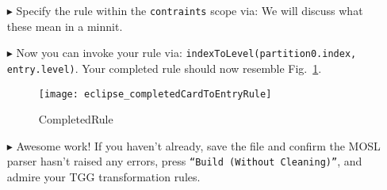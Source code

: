\begin{itemize}
\item[$\blacktriangleright$] Specify the rule within the \texttt{contraints} scope via:  We will discuss what
these mean in a minnit.

\item[$\blacktriangleright$] Now you can invoke your rule via: \texttt{indexToLevel(partition0.index, entry.level)}. Your completed rule should now resemble
Fig.~\ref{fig:c2eDone}.

\begin{figure}[htbp]
\begin{center}
  \texttt{[image: eclipse\_completedCardToEntryRule]}
  \caption{CompletedRule}
  \label{fig:c2eDone}
\end{center}
\end{figure}

\item[$\blacktriangleright$] Awesome work! If you haven't already, save the file and confirm the MOSL parser hasn't raised any errors, press
\texttt{``Build (Without Cleaning)''}, and admire your TGG transformation rules. 

\end{itemize}
